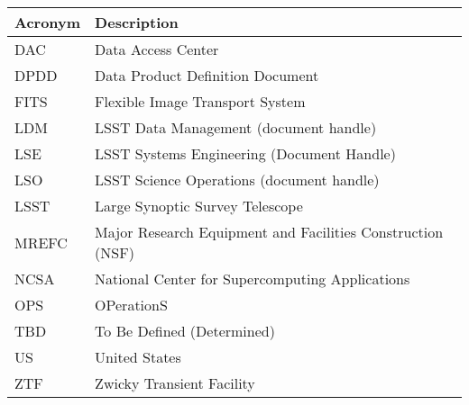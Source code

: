 \addtocounter{table}{-1}
\begin{longtable}{|l|p{}|}\hline
\textbf{Acronym} & \textbf{Description}  \\\hline

DAC & Data Access Center \\\hline
DPDD & Data Product Definition Document \\\hline
FITS & Flexible Image Transport System \\\hline
LDM & LSST Data Management (document handle) \\\hline
LSE & LSST Systems Engineering (Document Handle) \\\hline
LSO & LSST Science Operations (document handle) \\\hline
LSST & Large Synoptic Survey Telescope \\\hline
MREFC & Major Research Equipment and Facilities Construction (NSF) \\\hline
NCSA & National Center for Supercomputing Applications \\\hline
OPS & OPerationS \\\hline
TBD & To Be Defined (Determined) \\\hline
US & United States \\\hline
ZTF & Zwicky Transient Facility \\\hline
\end{longtable}
